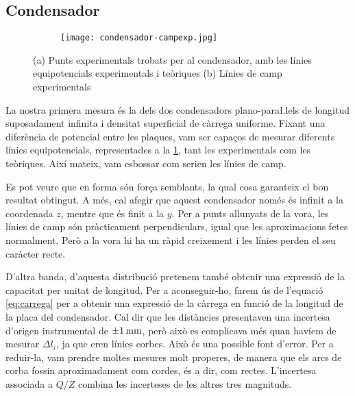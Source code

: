 \subsection{Condensador}
\begin{figure}[htb]
  \centering \small \sffamily
	\begin{subfigure}[b]{\textwidth}
		\centering
  	
		\caption{}
	\end{subfigure}

  \begin{subfigure}[b]{\textwidth}
		\centering
		\texttt{[image: condensador-campexp.jpg]}
		\caption{}
	\end{subfigure}
  \caption{(a) Punts experimentals trobats per al condensador, amb les línies equipotencials experimentals i teòriques
  (b) Línies de camp experimentals}
  \label{fig:camp condensador}
\end{figure}

La nostra primera mesura és la dels dos condensadors plano-para\l.lels de longitud suposadament infinita i densitat superficial de càrrega uniforme. Fixant una diferència de potencial entre les plaques, vam ser capaços de mesurar diferents línies equipotencials, representades a la \cref{fig:camp condensador}, tant les experimentals com les teòriques. Així mateix, vam esbossar com serien les línies de camp.

Es pot veure que en forma són força semblants, la qual cosa garanteix el bon resultat obtingut. A més, cal afegir que aquest condensador només és infinit a la coordenada $z$, mentre que és finit a la $y$. Per a punts allunyats de la vora, les línies de camp són pràcticament perpendiculars, igual que les aproximacions fetes normalment. Però a la vora hi ha un ràpid creixement i les línies perden el seu caràcter recte.

D'altra banda, d'aquesta distribució pretenem també obtenir una expressió de la capacitat per unitat de longitud. Per a aconseguir-ho, farem ús de l'equació \cref{eq:carrega} per a obtenir una expressió de la càrrega en funció de la longitud de la placa del condensador. Cal dir que les distàncies presentaven una incertesa d'origen instrumental de $ \data{}{1}{mm} $, però això es complicava més quan havíem de mesurar $\Delta l_i$, ja que eren línies corbes. Això és una possible font d'error. Per a reduir-la, vam prendre moltes mesures molt properes, de manera que els arcs de corba fossin aproximadament com cordes, és a dir, com rectes. L'incertesa associada a $Q/Z$ combina les incerteses de les altres tres magnituds.

